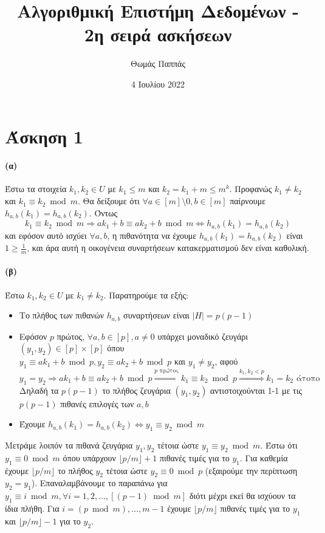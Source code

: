 \documentclass[a4paper,11pt]{article}
\newcommand{\RightarrowArg}[1]{\stackrel{#1}{\Longrightarrow}}
\begin{document}
\title{Αλγοριθμική Επιστήμη Δεδομένων - 2η σειρά ασκήσεων}
\author{Θωμάς Παππάς}
\date{4 Ιουλίου 2022}
\maketitle

\section*{Άσκηση 1}

\paragraph{(α)} Έστω τα στοιχεία $k_1,k_2 \in U$ με $k_1 \leq m$ και $k_2 = k_1+m \leq m^k$.
Προφανώς $k_1 \neq k_2$ και $k_1 \equiv k_2 \bmod m$.
Θα δείξουμε ότι $\forall a \in [m] \setminus 0, b \in [m]$ παίρνουμε $h_{a,b}(k_1) = h_{a,b}(k_2)$.
Όντως
\[k_1 \equiv k_2 \bmod m \Rightarrow ak_1+b \equiv ak_2+b \bmod m \Leftrightarrow h_{a,b}(k_1) = h_{a,b}(k_2)\]
και εφόσον αυτό ισχύει $\forall a, b$, η πιθανότητα να έχουμε $h_{a,b}(k_1) = h_{a,b}(k_2)$ είναι $1 \geq \frac1{m}$, και άρα αυτή η οικογένεια συναρτήσεων κατακερματισμού δεν είναι καθολική.

\paragraph{(β)} Έστω $k_1,k_2 \in U$ με $k_1 \neq k_2$. Παρατηρούμε τα εξής:

\begin{itemize}
	\item Το πλήθος των πιθανών $h_{a,b}$ συναρτήσεων είναι $|H|=p(p-1)$
	\item Εφόσον $p$ πρώτος, $\forall a,b \in [p], a \neq 0$ υπάρχει μοναδικό ζευγάρι $(y_1,y_2) \in [p] \times [p]$ όπου\\
		$y_1 \equiv ak_1+b \bmod p, y_2 \equiv ak_2+b \bmod p$ και $y_1 \neq y_2$, αφού
		\[y_1=y_2 \Rightarrow ak_1+b \equiv ak_2+b \bmod p \RightarrowArg{p \text{ πρώτος}} k_1 \equiv k_2 \bmod p \RightarrowArg{k_1,k_2<p} k_1=k_2 \text{ άτοπο}\]
		Δηλαδή τα $p(p-1)$ το πλήθος ζευγάρια $(y_1,y_2)$ αντιστοιχούνται 1-1 με τις $p(p-1)$ πιθανές επιλογές των $a,b$
	\item Έχουμε $h_{a,b}(k_1) = h_{a,b}(k_2) \Leftrightarrow y_1 \equiv y_2 \bmod m$
\end{itemize}
Μετράμε λοιπόν τα πιθανά ζευγάρια $y_1,y_2$ τέτοια ώστε $y_1 \equiv y_2 \bmod m$.
Έστω ότι $y_1 \equiv 0 \bmod m$ όπου υπάρχουν $\lfloor p/m \rfloor + 1$ πιθανές τιμές για το $y_1$. Για καθεμία έχουμε $\lfloor p/m \rfloor$ το πλήθος $y_2$ τέτοια ώστε $y_2 \equiv 0 \bmod p$ (εξαιρούμε την περίπτωση $y_2=y_1$).
Επαναλαμβάνουμε το παραπάνω για $y_1 \equiv i \bmod m, \forall i = 1,2,\dots,[(p-1) \bmod m]$ διότι μέχρι εκεί θα ισχύουν τα ίδια πλήθη. Για $i=(p \bmod m),\dots,m-1$ έχουμε $\lfloor p/m \rfloor$ πιθανές τιμές για το $y_1$ και $\lfloor p/m \rfloor - 1$ για το $y_2$.
\end{document}
